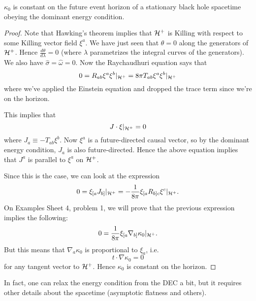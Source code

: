 \begin{thm}
    $\kappa_0$ is constant on the future event horizon of a stationary black hole spacetime obeying the dominant energy condition.
\end{thm}
\begin{proof}
    Note that Hawking's theorem implies that $\mathcal H^+$ is Killing with respect to some Killing vector field $\xi^a$. We have just seen that $\theta=0$ along the generators of $\mathcal H^+$. Hence $\frac{d\theta}{d\lambda}=0$ (where $\lambda$ parametrizes the integral curves of the generators). We also have $\hat \sigma = \hat \omega =0$. Now the Raychaudhuri equation says that
    \begin{equation}
        0=R_{ab} \xi^a \xi^b|_{\mathcal H^+} = 8\pi T_{ab} \xi^a \xi^b|_{\mathcal H^+}
    \end{equation}
    where we've applied the Einstein equation and dropped the trace term since we're on the horizon.
    
    This implies that
    \begin{equation}
        J\cdot \xi|_{\mathcal H^+} =0
    \end{equation}
    where $J_a \equiv -T_{ab}\xi^b$. Now $\xi^a$ is a future-directed causal vector, so by the dominant energy condition, $J_a$ is also future-directed. Hence the above equation implies that $J^a$ is parallel to $\xi^a$ on $\mathcal H^+$.%
    
    Since this is the case, we can look at the expression
    \begin{equation}
        0=\xi_{[a}J_{b]}|_{\mathcal H^+}= -\frac{1}{8\pi} \xi_{[a} R_{b]c} \xi^c |_{\mathcal H^+}.
    \end{equation}
    On Examples Sheet 4, problem 1, we will prove that the previous expression implies the following:
    \begin{equation}
        0=\frac{1}{8\pi} \xi_{[a}\nabla_{b]}\kappa_0|_{\mathcal H^+}.
    \end{equation}
    But this means that $\nabla_a \kappa_0$ is proportional to $\xi_a$, i.e. 
    \begin{equation}
        t \cdot \nabla \kappa_0=0
    \end{equation}
    for any tangent vector to $\mathcal H^+$. Hence $\kappa_0$ is constant on the horizon.
\end{proof}
In fact, one can relax the energy condition from the DEC a bit, but it requires other details about the spacetime (asymptotic flatness and others).

